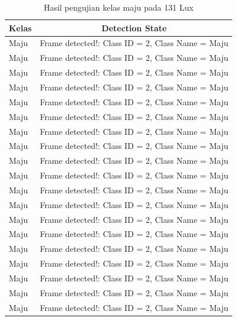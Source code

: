\begin{longtable}{|l|c|}
  \caption{Hasil pengujian kelas maju pada 131 Lux}
  \label{tb:lux131maju} \\
  \hline
  \rowcolor[HTML]{C0C0C0} 
  \textbf{Kelas} & \textbf{Detection State}                           \\ \hline
  Maju           & Frame detected!: Class ID = 2, Class Name = Maju   \\ \hline
  Maju           & Frame detected!: Class ID = 2, Class Name = Maju   \\ \hline
  Maju           & Frame detected!: Class ID = 2, Class Name = Maju   \\ \hline
  Maju           & Frame detected!: Class ID = 2, Class Name = Maju   \\ \hline
  Maju           & Frame detected!: Class ID = 2, Class Name = Maju   \\ \hline
  Maju           & Frame detected!: Class ID = 2, Class Name = Maju   \\ \hline
  Maju           & Frame detected!: Class ID = 2, Class Name = Maju   \\ \hline
  Maju           & Frame detected!: Class ID = 2, Class Name = Maju   \\ \hline
  Maju           & Frame detected!: Class ID = 2, Class Name = Maju \\ \hline
  Maju           & Frame detected!: Class ID = 2, Class Name = Maju   \\ \hline
  Maju           & Frame detected!: Class ID = 2, Class Name = Maju   \\ \hline
  Maju           & Frame detected!: Class ID = 2, Class Name = Maju   \\ \hline
  Maju           & Frame detected!: Class ID = 2, Class Name = Maju   \\ \hline
  Maju           & Frame detected!: Class ID = 2, Class Name = Maju   \\ \hline
  Maju           & Frame detected!: Class ID = 2, Class Name = Maju   \\ \hline
  Maju           & Frame detected!: Class ID = 2, Class Name = Maju   \\ \hline
  Maju           & Frame detected!: Class ID = 2, Class Name = Maju \\ \hline
  Maju           & Frame detected!: Class ID = 2, Class Name = Maju   \\ \hline
  Maju           & Frame detected!: Class ID = 2, Class Name = Maju   \\ \hline

\end{longtable}

